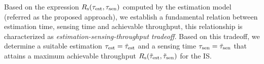 \begin{remark} \label{rem:rem2}
\normalfont
Based on the expression $R_{\text{s}}(\tau_{\text{est}}, \tau_{\text{sen}})$ computed by the estimation model (referred as the proposed approach), we establish a fundamental relation between estimation time, sensing time and achievable throughput, this relationship is characterized as \textit{estimation-sensing-throughput tradeoff}. Based on this tradeoff, we determine a suitable estimation $\tau_{\text{est}} = \tilde{\tau}_{\text{est}}$ and a sensing time $\tau_{\text{sen}} = \tilde{\tau}_{\text{sen}}$ that attains a maximum achievable throughput ${R}_{\text{s}}(\tilde{\tau}_{\text{est}},\tilde{\tau}_{\text{sen}})$ for the IS.  
\end{remark}

